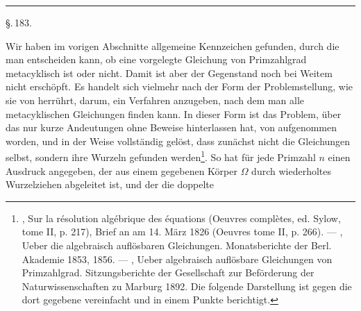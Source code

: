 \begin{center}


\rule{0.3\linewidth}{0.4pt}

\S.\,183.

\end{center}

Wir haben im vorigen Abschnitte allgemeine Kennzeichen gefunden, durch die man entscheiden kann, ob eine vorgelegte Gleichung von Primzahlgrad metacyklisch ist oder nicht. Damit ist aber der Gegenstand noch bei Weitem nicht erschöpft. Es handelt sich vielmehr nach der Form der Problemstellung, wie sie von  herrührt, darum, ein Verfahren anzugeben, nach dem man alle metacyklischen Gleichungen finden kann. In dieser Form ist das Problem, über das  nur kurze Andeutungen ohne Beweise hinterlassen hat, von  aufgenommen worden, und in der Weise vollständig gelöst, dass zunächst nicht die Gleichungen selbst, sondern ihre Wurzeln gefunden werden\footnote{, Sur la résolution algébrique des équations (Oeuvres complètes, ed. Sylow, tome II, p. 217), Brief an  am 14. März 1826 (Oeuvres tome II, p. 266). --- , Ueber die algebraisch auflösbaren Gleichungen. Monatsberichte der Berl. Akademie 1853, 1856. --- , Ueber algebraisch auflösbare Gleichungen von Primzahlgrad. Sitzungsberichte der Gesellschaft zur Beförderung der Naturwissenschaften zu Marburg 1892. Die folgende Darstellung ist gegen die dort gegebene vereinfacht und in einem Punkte berichtigt.}. So hat  für jede Primzahl $n$ einen Ausdruck angegeben, der aus einem gegebenen Körper $\Omega$ durch wiederholtes Wurzelziehen abgeleitet ist, und der die doppelte
